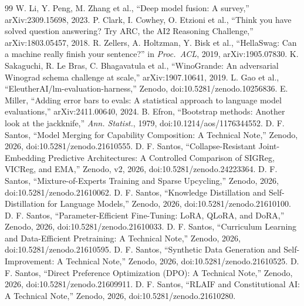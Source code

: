 \documentclass[conference]{IEEEtran}
\begin{document}
\begin{thebibliography}{99}
 W. Li, Y. Peng, M. Zhang et al., ``Deep model fusion: A survey,'' arXiv:2309.15698, 2023.
 P. Clark, I. Cowhey, O. Etzioni et al., ``Think you have solved question answering? Try ARC, the AI2 Reasoning Challenge,'' arXiv:1803.05457, 2018.
 R. Zellers, A. Holtzman, Y. Bisk et al., ``HellaSwag: Can a machine really finish your sentence?'' in \emph{Proc.\ ACL}, 2019, arXiv:1905.07830.
 K. Sakaguchi, R. Le Bras, C. Bhagavatula et al., ``WinoGrande: An adversarial Winograd schema challenge at scale,'' arXiv:1907.10641, 2019.
 L. Gao et al., ``EleutherAI/lm-evaluation-harness,'' Zenodo, doi:10.5281/zenodo.10256836.
 E. Miller, ``Adding error bars to evals: A statistical approach to language model evaluations,'' arXiv:2411.00640, 2024.
 B. Efron, ``Bootstrap methods: Another look at the jackknife,'' \emph{Ann. Statist.}, 1979, doi:10.1214/aos/1176344552.
 D. F. Santos, ``Model Merging for Capability Composition: A Technical Note,'' Zenodo, 2026, doi:10.5281/zenodo.21610555.
 D. F. Santos, ``Collapse-Resistant Joint-Embedding Predictive Architectures: A Controlled Comparison of SIGReg, VICReg, and EMA,'' Zenodo, v2, 2026, doi:10.5281/zenodo.24223364.
 D. F. Santos, ``Mixture-of-Experts Training and Sparse Upcycling,'' Zenodo, 2026, doi:10.5281/zenodo.21610062.
 D. F. Santos, ``Knowledge Distillation and Self-Distillation for Language Models,'' Zenodo, 2026, doi:10.5281/zenodo.21610100.
 D. F. Santos, ``Parameter-Efficient Fine-Tuning: LoRA, QLoRA, and DoRA,'' Zenodo, 2026, doi:10.5281/zenodo.21610033.
 D. F. Santos, ``Curriculum Learning and Data-Efficient Pretraining: A Technical Note,'' Zenodo, 2026, doi:10.5281/zenodo.21610595.
 D. F. Santos, ``Synthetic Data Generation and Self-Improvement: A Technical Note,'' Zenodo, 2026, doi:10.5281/zenodo.21610525.
 D. F. Santos, ``Direct Preference Optimization (DPO): A Technical Note,'' Zenodo, 2026, doi:10.5281/zenodo.21609911.
 D. F. Santos, ``RLAIF and Constitutional AI: A Technical Note,'' Zenodo, 2026, doi:10.5281/zenodo.21610280.
\end{thebibliography}
\end{document}

